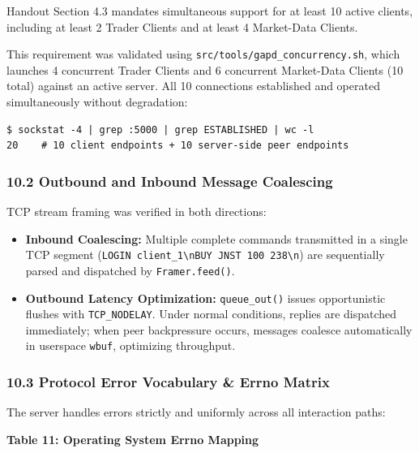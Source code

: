 \documentclass[
]{article}
\providecommand{\tightlist}{%
  \setlength{\itemsep}{0pt}\setlength{\parskip}{0pt}}
\begin{document}
Handout Section 4.3 mandates simultaneous support for at least 10 active
clients, including at least 2 Trader Clients and at least 4 Market-Data
Clients.

This requirement was validated using
\texttt{src/tools/gapd\_concurrency.sh}, which launches 4 concurrent
Trader Clients and 6 concurrent Market-Data Clients (10 total) against
an active server. All 10 connections established and operated
simultaneously without degradation:

\begin{verbatim}
$ sockstat -4 | grep :5000 | grep ESTABLISHED | wc -l
20    # 10 client endpoints + 10 server-side peer endpoints
\end{verbatim}

\hypertarget{outbound-and-inbound-message-coalescing}{%
\subsubsection{10.2 Outbound and Inbound Message
Coalescing}\label{outbound-and-inbound-message-coalescing}}

TCP stream framing was verified in both directions:

\begin{itemize}
\tightlist
\item
  \textbf{Inbound Coalescing:} Multiple complete commands transmitted in
  a single TCP segment
  (\texttt{LOGIN\ client\_1\textbackslash{}nBUY\ JNST\ 100\ 238\textbackslash{}n})
  are sequentially parsed and dispatched by \texttt{Framer.feed()}.
\item
  \textbf{Outbound Latency Optimization:} \texttt{queue\_out()} issues
  opportunistic flushes with \texttt{TCP\_NODELAY}. Under normal
  conditions, replies are dispatched immediately; when peer backpressure
  occurs, messages coalesce automatically in userspace \texttt{wbuf},
  optimizing throughput.
\end{itemize}

\hypertarget{protocol-error-vocabulary-errno-matrix}{%
\subsubsection{10.3 Protocol Error Vocabulary \& Errno
Matrix}\label{protocol-error-vocabulary-errno-matrix}}

The server handles errors strictly and uniformly across all interaction
paths:

\textbf{Table 11: Operating System Errno Mapping}
\end{document}
